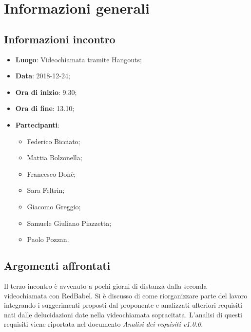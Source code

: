\section{Informazioni generali}

\subsection{Informazioni incontro}
\begin{itemize}
\item \textbf{Luogo}: Videochiamata tramite Hangouts;
\item \textbf{Data}: 2018-12-24;
\item \textbf{Ora di inizio}: 9.30;
\item \textbf{Ora di fine}: 13.10;
\item \textbf{Partecipanti}:
\begin{itemize}
	\item Federico Bicciato;
	\item Mattia Bolzonella;
	\item Francesco Donè;
	\item Sara Feltrin;
	\item Giacomo Greggio;
	\item Samuele Giuliano Piazzetta;
	\item Paolo Pozzan.
\end{itemize}
\end{itemize}

\subsection{Argomenti affrontati}
Il terzo incontro è avvenuto a pochi giorni di distanza dalla seconda videochiamata
con RedBabel. Si è discusso di come riorganizzare parte del lavoro integrando 
i suggerimenti proposti dal proponente e analizzati ulteriori requisiti nati dalle
delucidazioni date nella videochiamata sopracitata. L'analisi di questi requisiti 
viene riportata nel documento \textit{Analisi dei requisiti v1.0.0}.
